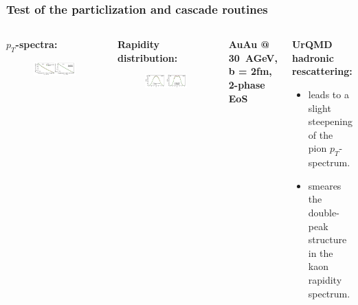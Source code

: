 \documentclass[dvipsnames] {beamer}
\begin{document}
\begin{frame}
  \frametitle{Test of the particlization and cascade routines}
  \begin{columns}[c]
    \begin{block}{\bf \centering $p_{T}$-spectra:}
    \begin{figure}[H]
      \includegraphics[width=1.\textwidth]{pT_spectra.jpg}
    \end{figure}
  \end{block}
  
  \begin{block}{\bf \centering Rapidity distribution:}
   \begin{figure}[H]
     \includegraphics[width=1.\textwidth]{ySpectra.jpg}
   \end{figure}
  \end{block}
  \begin{block}{}
    \begin{center}
      {\small \bf AuAu @ 30~AGeV, b = 2fm, 2-phase EoS}
  \end{center}
  \end{block}
  
  \begin{block}{\bf \centering UrQMD hadronic rescattering:}
    {\footnotesize \bf
    \begin{itemize}
    \item leads to a slight steepening of the pion $p_{T}$-spectrum.
    \item smeares the double-peak structure in the kaon rapidity spectrum.
    \end{itemize}
    }
  \end{block}
  \end{columns}
\end{frame}
\end{document}
